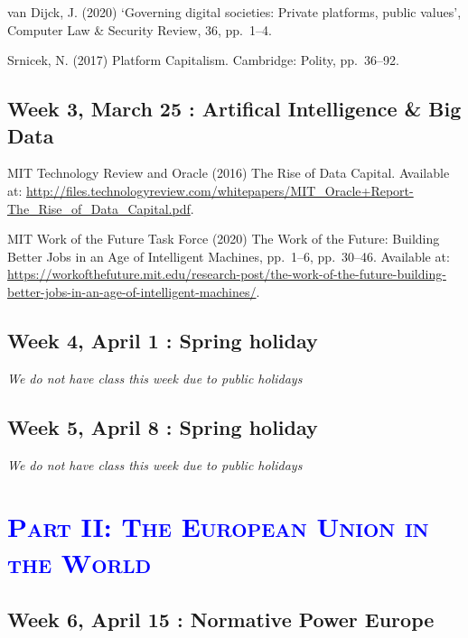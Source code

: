 \documentclass[12pt,]{article}
\begin{document}
van Dijck, J. (2020) `Governing digital societies: Private platforms,
public values', Computer Law \& Security Review, 36, pp.~1--4.

Srnicek, N. (2017) Platform Capitalism. Cambridge: Polity, pp.~36--92.

\hypertarget{week-3-march-25-artifical-intelligence-big-data}{%
\subsection{Week 3, March 25 : Artifical Intelligence \& Big
Data}\label{week-3-march-25-artifical-intelligence-big-data}}

MIT Technology Review and Oracle (2016) The Rise of Data Capital.
Available at:
\url{http://files.technologyreview.com/whitepapers/MIT_Oracle+Report-The_Rise_of_Data_Capital.pdf}.

MIT Work of the Future Task Force (2020) The Work of the Future:
Building Better Jobs in an Age of Intelligent Machines, pp.~1--6,
pp.~30--46. Available at:
\url{https://workofthefuture.mit.edu/research-post/the-work-of-the-future-building-better-jobs-in-an-age-of-intelligent-machines/}.

\hypertarget{week-4-april-1-spring-holiday}{%
\subsection{Week 4, April 1 : Spring
holiday}\label{week-4-april-1-spring-holiday}}

\emph{We do not have class this week due to public holidays}

\hypertarget{week-5-april-8-spring-holiday}{%
\subsection{Week 5, April 8 : Spring
holiday}\label{week-5-april-8-spring-holiday}}

\emph{We do not have class this week due to public holidays}

\hypertarget{section-1}{%
\section{\texorpdfstring{\textcolor{Blue}{\textsc{Part II: The European Union in the World}}}{}}\label{section-1}}

\vspace{0.5cm}

\hypertarget{week-6-april-15-normative-power-europe}{%
\subsection{Week 6, April 15 : Normative Power
Europe}\label{week-6-april-15-normative-power-europe}}
\end{document}
